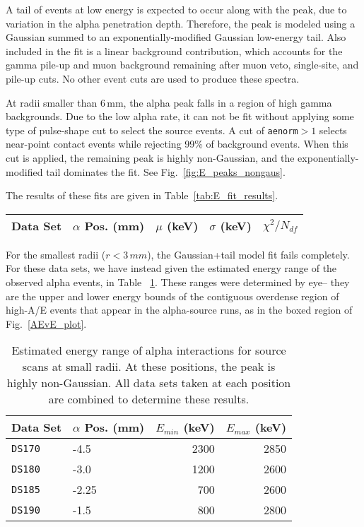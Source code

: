 \documentclass[groupedaddress,rmp,amsmath,amssymb,bibnotes,altaffilletter,twocolumn]{revtex4-1}
\begin{document}
A tail of events at low energy is expected to occur along with the peak, due to variation in the alpha penetration depth. Therefore, the peak is modeled using a Gaussian summed to an exponentially-modified Gaussian low-energy tail. Also included in the fit is a linear background contribution, which accounts for the gamma pile-up and muon background remaining after muon veto, single-site, and pile-up cuts. No other event cuts are used to produce these spectra. 

At radii smaller than 6\,mm, the alpha peak falls in a region of high gamma backgrounds. Due to the low alpha rate, it can not be fit without applying some type of pulse-shape cut to select the source events. A cut of {\tt aenorm}$>1$ selects near-point contact events while rejecting 99\% of background events. When this cut is applied, the remaining peak is highly non-Gaussian, and the exponentially-modified tail dominates the fit. See Fig.~\ref{fig:E_peaks_nongaus}. 

The results of these fits are given in Table~\ref{tab:E_fit_results}. 

\begin{table*}[]
\begin{center}
\begin{tabular}{l l r r r}
Data Set& $\alpha$ Pos. (mm) & $\mu$ (keV) & $\sigma$ (keV) & $\chi^2/N_{df}$\\  \hline

\end{tabular}
\caption{The results of a Gaussian+linear background fit to the alpha peak, at various scanning positions} \label{tab:E_fit_results}
\end{center}
\end{table*}

For the smallest radii ($r<3\,mm$), the Gaussian+tail model fit fails completely. For these data sets, we have instead given the estimated energy range of the observed alpha events, in Table ~\ref{tab:E_ranges}. These ranges were determined by eye-- they are the upper and lower energy bounds of the contiguous overdense region of high-A/E events that appear in the alpha-source runs, as in the boxed region of Fig.~\ref{AEvE_plot}.

\begin{table}[]
\begin{center}
\begin{tabular}{l l r r}
Data Set& $\alpha$ Pos. (mm) & $E_{min}$ (keV) & $E_{max}$ (keV) \\  \hline
{\tt DS170} & -4.5 & 2300 & 2850 \\
{\tt DS180} & -3.0 & 1200 & 2600 \\
{\tt DS185} & -2.25 & 700 & 2600 \\
{\tt DS190} & -1.5 & 800 & 2800 \\
\end{tabular}
\caption{Estimated energy range of alpha interactions for source scans at small radii. At these positions, the peak is highly non-Gaussian. All data sets taken at each position are combined to determine these results.} \label{tab:E_ranges}
\end{center}
\end{table}
\end{document}
